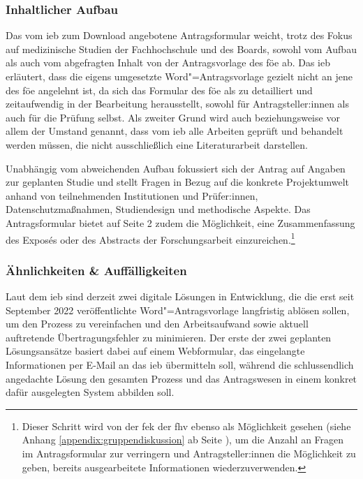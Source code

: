 \documentclass[a4paper,12pt,twoside]{scrreprt}
\begin{document}
\subsubsection*{Inhaltlicher Aufbau}
\label{sub-sub-sec:fh-oö-inhaltlicher-aufbau}

Das vom \ac{ieb} zum Download angebotene Antragsformular weicht, trotz des Fokus auf medizinische Studien der Fachhochschule und des Boards, sowohl vom Aufbau als auch vom abgefragten Inhalt von der Antragsvorlage des \ac{föe} ab. Das \ac{ieb} erläutert, dass die eigens umgesetzte Word"=Antragsvorlage gezielt nicht an jene des \ac{föe} angelehnt ist, da sich das Formular des \ac{föe} als zu detailliert und zeitaufwendig in der Bearbeitung herausstellt, sowohl für Antragsteller:innen als auch für die Prüfung selbst. Als zweiter Grund wird auch beziehungsweise vor allem der Umstand genannt, dass vom \ac{ieb} alle Arbeiten geprüft und behandelt werden müssen, die nicht ausschließlich eine Literaturarbeit darstellen. \cite{rosendahl-huber_extern-erfahrungen_2023}

\medskip

Unabhängig vom abweichenden Aufbau fokussiert sich der Antrag auf Angaben zur geplanten Studie und stellt Fragen in Bezug auf die konkrete Projektumwelt anhand von teilnehmenden Institutionen und Prüfer:innen, Datenschutzmaßnahmen, Studiendesign und methodische Aspekte. Das Antragsformular bietet auf Seite 2 zudem die Möglichkeit, eine Zusammenfassung des Exposés oder des Abstracts der Forschungsarbeit einzureichen.\footnote{Dieser Schritt wird von der \ac{fek} der \ac{fhv} ebenso als Möglichkeit gesehen (siehe Anhang \ref{appendix:gruppendiskussion} ab Seite \pageref{appendix:gruppendiskussion}), um die Anzahl an Fragen im Antragsformular zur verringern und Antragsteller:innen die Möglichkeit zu geben, bereits ausgearbeitete Informationen wiederzuverwenden.}

\subsubsection*{Ähnlichkeiten \& Auffälligkeiten}
\label{sub-sub-sec:ähnlichkeiten-auffälligkeiten-fh-oö}

Laut dem \ac{ieb} sind derzeit zwei digitale Lösungen in Entwicklung, die die erst seit September 2022 veröffentlichte Word"=Antragsvorlage langfristig ablösen sollen, um den Prozess zu vereinfachen und den Arbeitsaufwand sowie aktuell auftretende Übertragungsfehler zu minimieren. Der erste der zwei geplanten Lösungsansätze basiert dabei auf einem Webformular, das eingelangte Informationen per E-Mail an das \ac{ieb} übermitteln soll, während die schlussendlich angedachte Lösung den gesamten Prozess und das Antragswesen in einem konkret dafür ausgelegten System abbilden soll. \cite{rosendahl-huber_extern-erfahrungen_2023}
\end{document}
